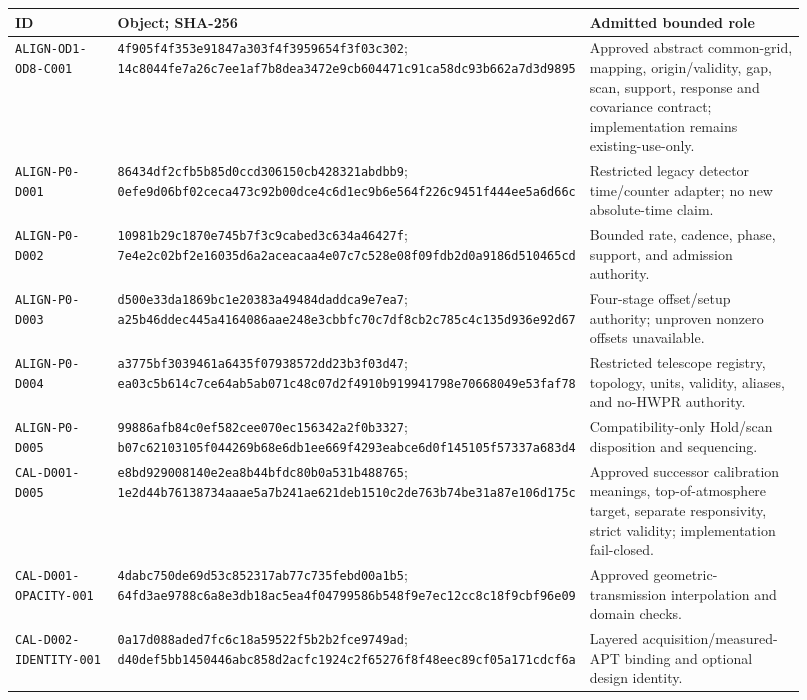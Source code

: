 \documentclass[11pt]{article}
\newcommand{\code}[1]{\nolinkurl{#1}}
\begin{document}
\begin{longtable}{@{}L{0.20\linewidth}L{0.25\linewidth}L{0.47\linewidth}@{}}
\toprule
ID & Object; SHA-256 & Admitted bounded role \\
\midrule
\endhead
\code{ALIGN-OD1-OD8-C001} & \code{4f905f4f353e91847a303f4f3959654f3f03c302}; \code{14c8044fe7a26c7ee1af7b8dea3472e9cb604471c91ca58dc93b662a7d3d9895} & Approved abstract common-grid, mapping, origin/validity, gap, scan, support, response and covariance contract; implementation remains existing-use-only. \\
\code{ALIGN-P0-D001} & \code{86434df2cfb5b85d0ccd306150cb428321abdbb9}; \code{0efe9d06bf02ceca473c92b00dce4c6d1ec9b6e564f226c9451f444ee5a6d66c} & Restricted legacy detector time/counter adapter; no new absolute-time claim. \\
\code{ALIGN-P0-D002} & \code{10981b29c1870e745b7f3c9cabed3c634a46427f}; \code{7e4e2c02bf2e16035d6a2aceacaa4e07c7c528e08f09fdb2d0a9186d510465cd} & Bounded rate, cadence, phase, support, and admission authority. \\
\code{ALIGN-P0-D003} & \code{d500e33da1869bc1e20383a49484daddca9e7ea7}; \code{a25b46ddec445a4164086aae248e3cbbfc70c7df8cb2c785c4c135d936e92d67} & Four-stage offset/setup authority; unproven nonzero offsets unavailable. \\
\code{ALIGN-P0-D004} & \code{a3775bf3039461a6435f07938572dd23b3f03d47}; \code{ea03c5b614c7ce64ab5ab071c48c07d2f4910b919941798e70668049e53faf78} & Restricted telescope registry, topology, units, validity, aliases, and no-HWPR authority. \\
\code{ALIGN-P0-D005} & \code{99886afb84c0ef582cee070ec156342a2f0b3327}; \code{b07c62103105f044269b68e6db1ee669f4293eabce6d0f145105f57337a683d4} & Compatibility-only Hold/scan disposition and sequencing. \\
\code{CAL-D001-D005} & \code{e8bd929008140e2ea8b44bfdc80b0a531b488765}; \code{1e2d44b76138734aaae5a7b241ae621deb1510c2de763b74be31a87e106d175c} & Approved successor calibration meanings, top-of-atmosphere target, separate responsivity, strict validity; implementation fail-closed. \\
\code{CAL-D001-OPACITY-001} & \code{4dabc750de69d53c852317ab77c735febd00a1b5}; \code{64fd3ae9788c6a8e3db18ac5ea4f04799586b548f9e7ec12cc8c18f9cbf96e09} & Approved geometric-transmission interpolation and domain checks. \\
\code{CAL-D002-IDENTITY-001} & \code{0a17d088aded7fc6c18a59522f5b2b2fce9749ad}; \code{d40def5bb1450446abc858d2acfc1924c2f65276f8f48eec89cf05a171cdcf6a} & Layered acquisition/measured-APT binding and optional design identity. \\

\end{longtable}
\end{document}
